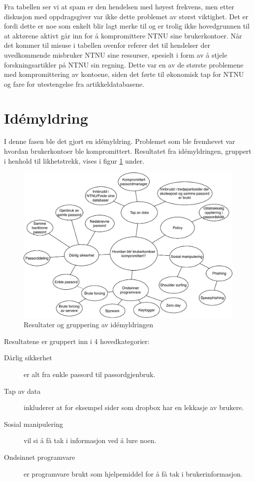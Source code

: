 Fra tabellen ser vi at spam er den hendelsen med høyest frekvens, men etter diskusjon med oppdragsgiver var ikke dette problemet av størst viktighet. Det er fordi dette er noe som enkelt blir lagt merke til og er trolig ikke hovedgrunnen til at aktørene aktivt går inn for å kompromittere NTNU sine brukerkontoer. Når det kommer til misuse i tabellen ovenfor referer det til hendelser der uvedkommende misbruker NTNU sine ressurser, spesielt i form av å stjele forskningsartikler på NTNU sin regning. Dette var en av de største problemene med kompromittering av kontoene, siden det førte til økonomisk tap for NTNU og fare for utestengelse fra artikkeldatabasene. 

\section{Idémyldring}
I denne fasen ble det gjort en idémyldring. Problemet som ble fremhevet var hvordan brukerkontoer ble kompromittert. Resultatet fra idémyldringen, gruppert i henhold til likhetstrekk, vises i figur \ref{fig:case2-idemyldring} under. 

\begin{figure}[H]
    \centering
    \includegraphics[scale=0.6]{case_2/bilder/idemyldring.pdf}
    \caption[Idémyldring for kompromitterte kontoer]{Resultater og gruppering av idémyldringen}
    \label{fig:case2-idemyldring}
\end{figure}

Resultatene er gruppert inn i 4 hovedkategorier:
\begin{description}
    \item [Dårlig sikkerhet] er alt fra enkle passord til passordgjenbruk.
    \item [Tap av data] inkluderer at for eksempel sider som dropbox har en lekkasje av brukere.
    \item [Sosial manipulering] vil si å få tak i informasjon ved å lure noen.
    \item [Ondsinnet programvare] er programvare brukt som hjelpemiddel for å få tak i brukerinformasjon.
\end{description}

